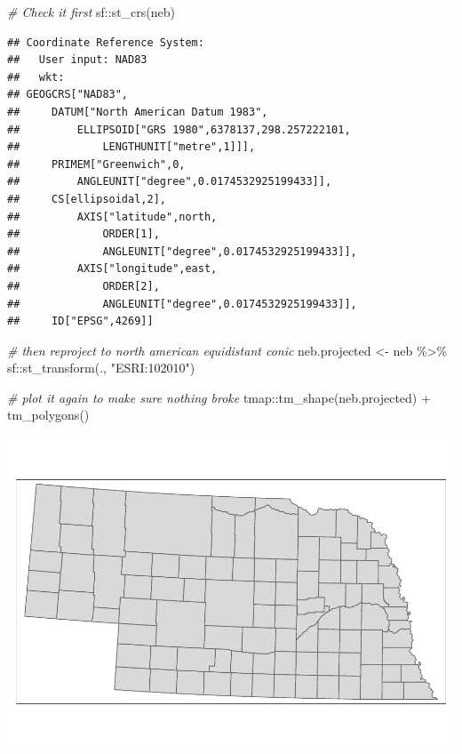 \documentclass[]{article}
\newenvironment{Shaded}{\begin{snugshade}}{\end{snugshade}}
\newcommand{\CommentTok}[1]{\textcolor[rgb]{0.56,0.35,0.01}{\textit{#1}}}
\newcommand{\FunctionTok}[1]{\textcolor[rgb]{0.00,0.00,0.00}{#1}}
\newcommand{\NormalTok}[1]{#1}
\newcommand{\OtherTok}[1]{\textcolor[rgb]{0.56,0.35,0.01}{#1}}
\newcommand{\SpecialCharTok}[1]{\textcolor[rgb]{0.00,0.00,0.00}{#1}}
\newcommand{\StringTok}[1]{\textcolor[rgb]{0.31,0.60,0.02}{#1}}
\begin{document}
\begin{Shaded}
\begin{Highlighting}[]
\CommentTok{\# Check it first}
\NormalTok{sf}\SpecialCharTok{::}\FunctionTok{st\_crs}\NormalTok{(neb) }
\end{Highlighting}
\end{Shaded}

\begin{verbatim}
## Coordinate Reference System:
##   User input: NAD83 
##   wkt:
## GEOGCRS["NAD83",
##     DATUM["North American Datum 1983",
##         ELLIPSOID["GRS 1980",6378137,298.257222101,
##             LENGTHUNIT["metre",1]]],
##     PRIMEM["Greenwich",0,
##         ANGLEUNIT["degree",0.0174532925199433]],
##     CS[ellipsoidal,2],
##         AXIS["latitude",north,
##             ORDER[1],
##             ANGLEUNIT["degree",0.0174532925199433]],
##         AXIS["longitude",east,
##             ORDER[2],
##             ANGLEUNIT["degree",0.0174532925199433]],
##     ID["EPSG",4269]]
\end{verbatim}

\begin{Shaded}
\begin{Highlighting}[]
\CommentTok{\# then reproject to north american equidistant conic}
\NormalTok{neb.projected }\OtherTok{\textless{}{-}}\NormalTok{ neb }\SpecialCharTok{\%\textgreater{}\%}\NormalTok{ sf}\SpecialCharTok{::}\FunctionTok{st\_transform}\NormalTok{(., }\StringTok{"ESRI:102010"}\NormalTok{)}

\CommentTok{\# plot it again to make sure nothing broke}
\NormalTok{tmap}\SpecialCharTok{::}\FunctionTok{tm\_shape}\NormalTok{(neb.projected) }\SpecialCharTok{+} \FunctionTok{tm\_polygons}\NormalTok{()}
\end{Highlighting}
\end{Shaded}

\includegraphics{lab03_files/figure-latex/make some neighbors-1.pdf}
\end{document}
